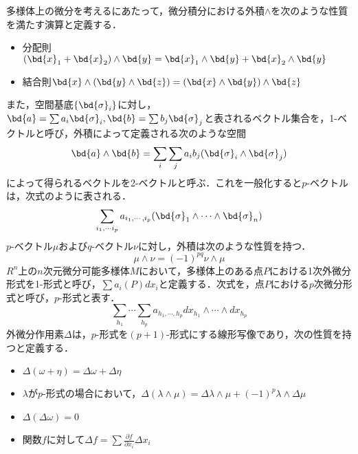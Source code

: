 		多様体上の微分を考えるにあたって，微分積分における外積$ \wedge $を次のような性質を満たす演算と定義する．
		\begin{itemize}
			\item 分配則$ (\bd{x}_1 + \bd{x}_2) \wedge \bd{y} = \bd{x}_1 \wedge \bd{y} + \bd{x}_2 \wedge \bd{y} $
			\item 結合則$ \bd{x} \wedge (\bd{y} \wedge \bd{z}) = (\bd{x} \wedge \bd{y} )\wedge \bd{z}$
		\end{itemize}
		また，空間基底$ \{ \bd{\sigma}_i \} $に対し，$ \bd{a} = \sum a_i \bd{\sigma}_i,\bd{b} = \sum b_j \bd{\sigma}_j$と表されるベクトル集合を，1-ベクトルと呼び，外積によって定義される次のような空間
		\begin{equation}\label{eq:Gaiseki}
			\bd{a} \wedge \bd{b} = \sum_i \sum_j a_i b_j (\bd{\sigma}_i \wedge \bd{\sigma}_j)
		\end{equation}
		によって得られるベクトルを2-ベクトルと呼ぶ．これを一般化すると$p$-ベクトルは，次式のように表される．
		\begin{equation}\label{eq:Gaiseki2}
			\sum_{i_1,\cdots i_p} a_{i_1,\cdots,i_p} (\bd{\sigma}_1 \wedge \cdots \wedge \bd{\sigma}_n)
		\end{equation}
		$ p $-ベクトル$ \mu $および$ q $-ベクトル$ \nu $に対し，外積は次のような性質を持つ．
		\begin{equation}\label{eq:Gaiseki3}
			\mu \wedge \nu = (-1)^{pq} \nu \wedge \mu
		\end{equation}
		$ R^n $上の$ n $次元微分可能多様体$ M $において，多様体上のある点$ P $における1次外微分形式を1-形式と呼び，$ \sum a_i(P)dx_i $と定義する．次式を，点$ P $における$ p $次微分形式と呼び，$ p $-形式と表す．
		\begin{equation}\label{eq:BIBUN1}
			\sum_{h_1} \cdots \sum_{h_p} a_{h_1,\cdots,h_p} dx_{h_1} \wedge \cdots \wedge dx_{h_p}
		\end{equation}
		外微分作用素$ \Delta $は，$p$-形式を$ (p+1) $-形式にする線形写像であり，次の性質を持つと定義する．
		\begin{itemize}
			\item $ \Delta(\omega + \eta) = \Delta \omega + \Delta \eta $ 
			\item $ \lambda $が$ p $-形式の場合において，$ \Delta(\lambda \wedge \mu ) = \Delta \lambda \wedge \mu + (-1)^p \lambda \wedge \Delta \mu $
			\item $ \Delta (\Delta \omega) = 0 $
			\item 関数$ f $に対して$ \Delta f = \sum \frac{\partial f}{\partial x_i }\Delta x_i $
		\end{itemize}
